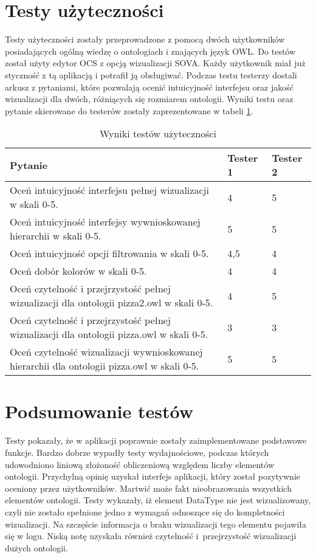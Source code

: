 \section{Testy użyteczności}
Testy użyteczności zostały przeprowadzone z pomocą dwóch użytkowników posiadających ogólną wiedzę o ontologiach i znających  język OWL. 
Do testów został użyty edytor OCS z opcją wizualizacji SOVA. Każdy użytkownik miał już styczność z tą aplikacją i potrafił ją obsługiwać. Podczas testu testerzy 
dostali arkusz z pytaniami, które pozwalają ocenić intuicyjność interfejsu oraz jakość wizualizacji dla dwóch, różniących się rozmiarem ontologii. Wyniki testu oraz
pytanie skierowane do testerów zostały zaprezentowane w tabeli \ref{t:testy:uzytkownika}.  



\begin{longtable}{|m{9cm}|m{2cm}|m{2cm}|} 
\caption{Wyniki testów użyteczności}
\label{t:testy:uzytkownika} \\
\hline

Pytanie  & Tester 1 &  Tester 2 \\ \hline
Oceń intuicyjność interfejsu pełnej wizualizacji w skali 0-5. &  4 & 5 \\ \hline
Oceń intuicyjność interfejsy wywnioskowanej hierarchii w skali 0-5.& 5  & 5  \\ \hline
Oceń intuicyjność opcji filtrowania w skali 0-5.& 4,5 & 4 \\ \hline
Oceń dobór kolorów w skali 0-5.& 4 &  4 \\ \hline
Oceń czytelność i przejrzystość pełnej wizualizacji dla ontologii pizza2.owl w skali 0-5.& 4 & 5 \\ \hline
Oceń czytelność i przejrzystość pełnej wizualizacji dla ontologii pizza.owl w skali 0-5.& 3 & 3 \\ \hline
Oceń czytelność wizualizacji wywnioskowanej hierarchii dla ontologii pizza.owl w skali 0-5.& 5 & 5 \\ \hline

\end{longtable}

\section{Podsumowanie testów}
Testy pokazały, że w aplikacji poprawnie zostały zaimplementowane podstawowe funkcje. Bardzo dobrze wypadły testy wydajnościowe, podczas których udowodniono liniową 
złożoność obliczeniową względem liczby elementów ontologii. Przychylną opinię uzyskał interfejs aplikacji, który został pozytywnie oceniony przez użytkowników. 
Martwić może fakt nieobrazowania wszystkich elementów ontologii. Testy wykazały, iż element DataType nie jest wizualizowany, czyli nie zostało spełnione jedno z wymagań
odnoszące się do kompletności wizualizacji. Na szczęście informacja o braku wizualizacji tego elementu pojawiła się w logu. Niską notę uzyskała również czytelność 
i~przejrzystość wizualizacji dużych ontologii. 
 


